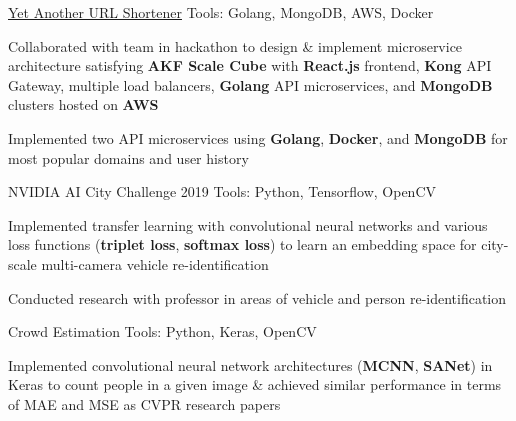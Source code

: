 \begin{cventries}
  \cventryprojects
    {\href{https://github.com/nguyensjsu/fa19-281-team-red-1}{Yet Another URL Shortener}} %
    {Tools: Golang, MongoDB, AWS, Docker} %
    {
      \begin{cvitems} %
       \item {Collaborated with team in hackathon to design \& implement microservice architecture satisfying \textbf{AKF Scale Cube} with \textbf{React.js} frontend, \textbf{Kong} API Gateway, multiple load balancers, \textbf{Golang} API microservices, and \textbf{MongoDB} clusters hosted on \textbf{AWS}}
        \item {Implemented two API microservices using \textbf{Golang}, \textbf{Docker}, and \textbf{MongoDB} for most popular domains and user history}
      \end{cvitems}
    }

  \cventryprojects
    {NVIDIA AI City Challenge 2019} %
    {Tools: Python, Tensorflow, OpenCV} %
    {
      \begin{cvitems} %
       \item {Implemented transfer learning with convolutional neural networks and various loss functions (\textbf{triplet loss}, \textbf{softmax loss}) to learn an embedding space for city-scale multi-camera vehicle re-identification}
        \item {Conducted research with professor in areas of vehicle and person re-identification}
      \end{cvitems}
    }

  \cventryprojects
    {Crowd Estimation} %
    {Tools: Python, Keras, OpenCV} %
    {
      \begin{cvitems} %
        \item {Implemented convolutional neural network architectures (\textbf{MCNN}, \textbf{SANet}) in Keras to count people in a given image \& achieved similar performance in terms of MAE and MSE as CVPR research papers}
      \end{cvitems}
    }


\end{cventries}
